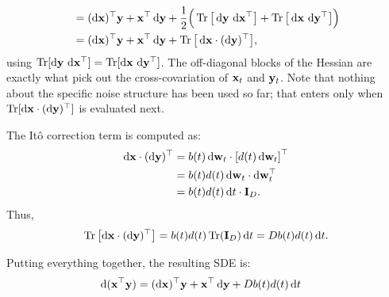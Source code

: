 {\begin{nknote}
\begin{align*}
&= (\diff\rvx)^\top\rvy + \rvx^\top\diff\rvy
 + \frac{1}{2}\Big(\Tr\big[\diff\rvy\,\diff\rvx^\top\big] + \Tr\big[\diff\rvx\,\diff\rvy^\top\big]\Big) \\
&= (\diff\rvx)^\top\rvy + \rvx^\top\diff\rvy + \Tr\big[\diff\rvx \cdot (\diff\rvy)^\top\big],
\end{align*}
using $\operatorname{Tr}[\mathop{}\!\mathrm{d}{\mathbf{y}}\,\mathop{}\!\mathrm{d}{\mathbf{x}}^\top] = \operatorname{Tr}[\mathop{}\!\mathrm{d}{\mathbf{x}}\,\mathop{}\!\mathrm{d}{\mathbf{y}}^\top]$. The off-diagonal blocks of the Hessian are exactly what pick out the cross-covariation of ${\mathbf{x}}_t$ and ${\mathbf{y}}_t$. Note that nothing about the specific noise structure has been used so far; that enters only when $\operatorname{Tr}[\mathop{}\!\mathrm{d}{\mathbf{x}}\cdot(\mathop{}\!\mathrm{d}{\mathbf{y}})^\top]$ is evaluated next.
\end{nknote}

The It\^o correction term is computed as:
\begin{align*}
    \mathop{}\!\mathrm{d} {\mathbf{x}} \cdot (\mathop{}\!\mathrm{d} {\mathbf{y}})^\top &= b(t) \mathop{}\!\mathrm{d} {\mathbf{w}}_t \cdot \left[ d(t) \mathop{}\!\mathrm{d} {\mathbf{w}}_t \right]^\top \\&= b(t) d(t) \mathop{}\!\mathrm{d} {\mathbf{w}}_t \cdot \mathop{}\!\mathrm{d} {\mathbf{w}}_t^\top \\&= b(t)d(t) \mathop{}\!\mathrm{d} t \cdot {\mathbf{I}}_D.
\end{align*}
Thus,
\[
\operatorname{Tr}\left[ \mathop{}\!\mathrm{d} {\mathbf{x}} \cdot (\mathop{}\!\mathrm{d} {\mathbf{y}})^\top \right] = b(t)d(t) \operatorname{Tr}({\mathbf{I}}_D) \mathop{}\!\mathrm{d} t = D  b(t)d(t) \mathop{}\!\mathrm{d} t.
\]

Putting everything together, the resulting SDE is:
\begin{align}\label{eq:ito-product}
\begin{aligned}
        \mathop{}\!\mathrm{d}({\mathbf{x}}^\top {\mathbf{y}}) &= (\mathop{}\!\mathrm{d} {\mathbf{x}})^\top {\mathbf{y}} + {\mathbf{x}}^\top \mathop{}\!\mathrm{d} {\mathbf{y}} + D  b(t)d(t) \mathop{}\!\mathrm{d} t
\end{aligned}
\end{align}
}



